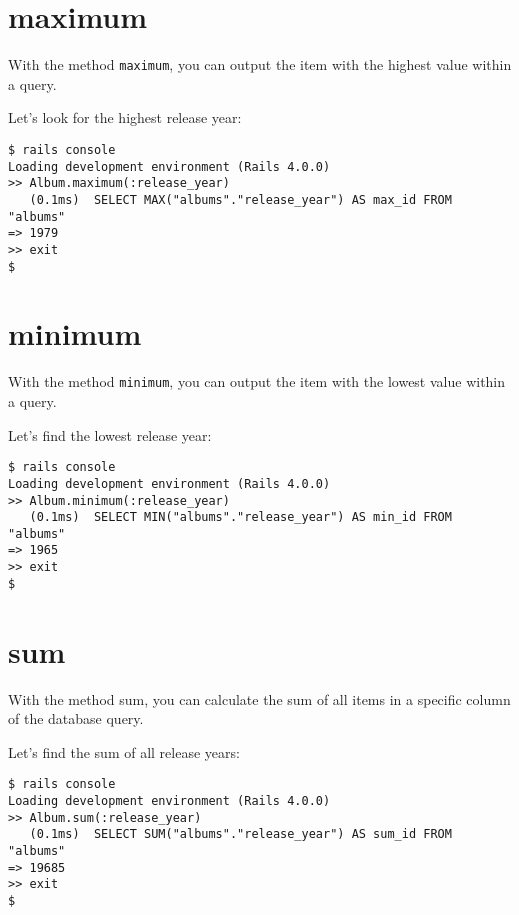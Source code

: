 \documentclass[a4paper]{book}
\newcounter{tab}[chapter]
\begin{document}
\section{maximum}\label{maximum}

With the method \texttt{maximum}, you can output the item with the highest value within a query.

Let's look for the highest release year:

\begin{shaded}\begin{verbatim}
$ rails console
Loading development environment (Rails 4.0.0)
>> Album.maximum(:release_year)
   (0.1ms)  SELECT MAX("albums"."release_year") AS max_id FROM "albums"
=> 1979
>> exit
$
\end{verbatim}\end{shaded}

\section{minimum}\label{minimum}

With the method \texttt{minimum}, you can output the item with the lowest value within a query.

Let's find the lowest release year:

\begin{shaded}\begin{verbatim}
$ rails console
Loading development environment (Rails 4.0.0)
>> Album.minimum(:release_year)
   (0.1ms)  SELECT MIN("albums"."release_year") AS min_id FROM "albums"
=> 1965
>> exit
$
\end{verbatim}\end{shaded}

\section{sum}\label{sum}

With the method sum, you can calculate the sum of all items in a specific column of the database query.

Let's find the sum of all release years:

\begin{shaded}\begin{verbatim}
$ rails console
Loading development environment (Rails 4.0.0)
>> Album.sum(:release_year)
   (0.1ms)  SELECT SUM("albums"."release_year") AS sum_id FROM "albums"
=> 19685
>> exit
$
\end{verbatim}\end{shaded}
\end{document}
